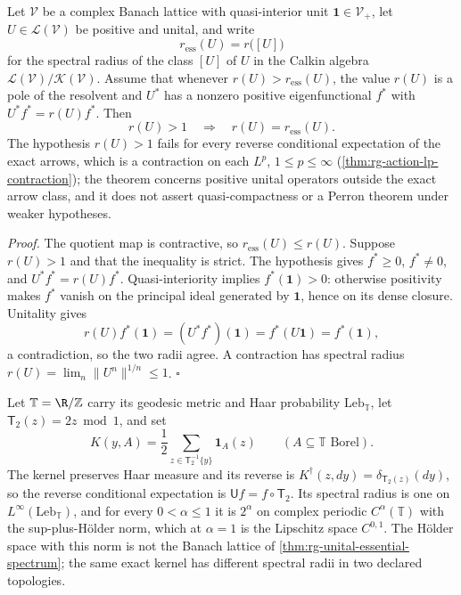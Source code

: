 Let \(\mathcal V\) be a complex Banach lattice with quasi-interior unit
\(\mathbf1\in\mathcal V_+\), let \(U\in\mathcal L(\mathcal V)\) be positive and
unital, and write
\begin{equation}
r_{\mathrm{ess}}(U)=r\bigl([U]\bigr)
\label{eq:rg-calkin-essential-radius}
\end{equation}
for the spectral radius of the class \([U]\) of \(U\) in the Calkin algebra
\(\mathcal L(\mathcal V)/\mathcal K(\mathcal V)\). Assume that whenever
\(r(U)>r_{\mathrm{ess}}(U)\), the value \(r(U)\) is a pole of the resolvent and
\(U^*\) has a nonzero positive eigenfunctional \(f^*\) with
\(U^*f^*=r(U)f^*\). Then
\begin{equation}
r(U)>1\quad\Longrightarrow\quad r(U)=r_{\mathrm{ess}}(U).
\label{eq:rg-unital-essential-spectrum-result}
\end{equation}
The hypothesis \(r(U)>1\) fails for every reverse conditional expectation of
the exact arrows, which is a contraction on each \(L^p\),
\(1\leq p\leq\infty\) (\cref{thm:rg-action-lp-contraction}); the theorem
concerns positive unital operators outside the exact arrow class, and it does
not assert quasi-compactness or a Perron theorem under weaker hypotheses.

\noindent\emph{Proof.}
The quotient map is contractive, so \(r_{\mathrm{ess}}(U)\leq r(U)\). Suppose
\(r(U)>1\) and that the inequality is strict. The hypothesis gives
\(f^*\geq0\), \(f^*\neq0\), and \(U^*f^*=r(U)f^*\). Quasi-interiority implies
\(f^*(\mathbf1)>0\): otherwise positivity makes \(f^*\) vanish on the principal
ideal generated by \(\mathbf1\), hence on its dense closure. Unitality gives
\begin{equation}
r(U)f^*(\mathbf1)
=(U^*f^*)(\mathbf1)
=f^*(U\mathbf1)=f^*(\mathbf1),
\label{eq:rg-unital-functional-pairing}
\end{equation}
a contradiction, so the two radii agree. A contraction has spectral radius
\(r(U)=\lim_n\lVert U^n\rVert^{1/n}\leq1\). \(\square\)

Let \(\mathbb T=\R/\mathbb Z\) carry its geodesic metric and Haar probability
\(\mathrm{Leb}_{\mathbb T}\), let \(\mathsf T_2(z)=2z\bmod1\), and set
\begin{equation}
K(y,A)=\frac12\sum_{z\in\mathsf T_2^{-1}\{y\}}\mathbf1_A(z)
\qquad(A\subseteq\mathbb T\text{ Borel}).
\label{eq:rg-circle-forward-kernel}
\end{equation}
The kernel preserves Haar measure and its reverse is
\(K^\dagger(z,dy)=\delta_{\mathsf T_2(z)}(dy)\), so the reverse conditional
expectation is \(\mathsf Uf=f\circ\mathsf T_2\). Its spectral radius is one on
\(L^\infty(\mathrm{Leb}_{\mathbb T})\), and for every \(0<\alpha\leq1\) it is
\(2^\alpha\) on complex periodic \(C^\alpha(\mathbb T)\) with the
sup-plus-H\"older norm, which at \(\alpha=1\) is the Lipschitz space
\(C^{0,1}\). The H\"older space with this norm is not the Banach lattice of
\cref{thm:rg-unital-essential-spectrum}; the same exact kernel has different
spectral radii in two declared topologies. 

